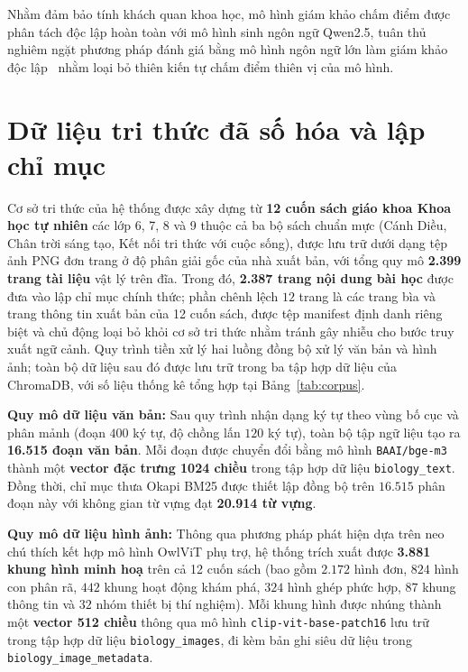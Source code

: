 Nhằm đảm bảo tính khách quan khoa học, mô hình giám khảo chấm điểm được phân tách độc lập hoàn toàn với mô hình sinh ngôn ngữ Qwen2.5, tuân thủ nghiêm ngặt phương pháp đánh giá bằng mô hình ngôn ngữ lớn làm giám khảo độc lập~\cite{zheng2023llmjudge} nhằm loại bỏ thiên kiến tự chấm điểm thiên vị của mô hình.

\section{Dữ liệu tri thức đã số hóa và lập chỉ mục}
\label{sec:corpus}
Cơ sở tri thức của hệ thống được xây dựng từ \textbf{12 cuốn sách giáo khoa Khoa học tự nhiên} các lớp 6, 7, 8 và 9 thuộc cả ba bộ sách chuẩn mực (Cánh Diều, Chân trời sáng tạo, Kết nối tri thức với cuộc sống), được lưu trữ dưới dạng tệp ảnh PNG đơn trang ở độ phân giải gốc của nhà xuất bản, với tổng quy mô \textbf{2.399 trang tài liệu} vật lý trên đĩa. Trong đó, \textbf{2.387 trang nội dung bài học} được đưa vào lập chỉ mục chính thức; phần chênh lệch $12$ trang là các trang bìa và trang thông tin xuất bản của 12 cuốn sách, được tệp manifest định danh riêng biệt và chủ động loại bỏ khỏi cơ sở tri thức nhằm tránh gây nhiễu cho bước truy xuất ngữ cảnh. Quy trình tiền xử lý hai luồng đồng bộ xử lý văn bản và hình ảnh; toàn bộ dữ liệu sau đó được lưu trữ trong ba tập hợp dữ liệu của ChromaDB, với số liệu thống kê tổng hợp tại Bảng~\ref{tab:corpus}.

\textbf{Quy mô dữ liệu văn bản:} Sau quy trình nhận dạng ký tự theo vùng bố cục và phân mảnh (đoạn $400$ ký tự, độ chồng lấn $120$ ký tự), toàn bộ tập ngữ liệu tạo ra \textbf{16.515 đoạn văn bản}. Mỗi đoạn được chuyển đổi bằng mô hình \texttt{BAAI/bge-m3}~\cite{chen2024bgem3} thành một \textbf{vector đặc trưng 1024 chiều} trong tập hợp dữ liệu \texttt{biology\_text}. Đồng thời, chỉ mục thưa Okapi BM25 được thiết lập đồng bộ trên $16.515$ phân đoạn này với không gian từ vựng đạt \textbf{20.914 từ vựng}.

\textbf{Quy mô dữ liệu hình ảnh:} Thông qua phương pháp phát hiện dựa trên neo chú thích kết hợp mô hình OwlViT phụ trợ, hệ thống trích xuất được \textbf{3.881 khung hình minh hoạ} trên cả 12 cuốn sách (bao gồm $2.172$ hình đơn, $824$ hình con phân rã, $442$ khung hoạt động khám phá, $324$ hình ghép phức hợp, $87$ khung thông tin và $32$ nhóm thiết bị thí nghiệm). Mỗi khung hình được nhúng thành một \textbf{vector 512 chiều} thông qua mô hình \texttt{clip-vit-base-patch16} lưu trữ trong tập hợp dữ liệu \texttt{biology\_images}, đi kèm bản ghi siêu dữ liệu trong \texttt{biology\_image\_metadata}.


